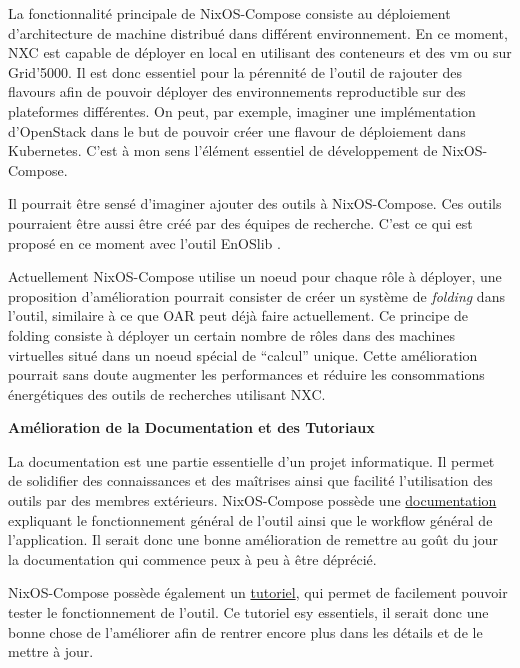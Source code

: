\documentclass[a4paper,french,12pt, titlepage]{article}
\begin{document}
La fonctionnalité principale de NixOS-Compose consiste au déploiement
d'architecture de machine distribué dans différent environnement. En ce
moment, NXC est capable de déployer en local en utilisant des conteneurs
et des vm ou sur Grid'5000. Il est donc essentiel pour la pérennité de
l'outil de rajouter des flavours afin de pouvoir déployer des
environnements reproductible sur des plateformes différentes. On peut,
par exemple, imaginer une implémentation d'OpenStack dans le but de
pouvoir créer une flavour de déploiement dans Kubernetes. C'est à mon
sens l'élément essentiel de développement de NixOS-Compose.\newline

Il pourrait être sensé d'imaginer ajouter des outils à NixOS-Compose.
Ces outils pourraient être aussi être créé par des équipes de recherche.
C'est ce qui est proposé en ce moment avec l'outil EnOSlib
\cite{enoslib2021}.\newline

Actuellement NixOS-Compose utilise un noeud pour chaque rôle à déployer,
une proposition d'amélioration pourrait consister de créer un système de
\emph{folding} \cite{folding2023} dans l'outil, similaire à ce que OAR
peut déjà faire actuellement. Ce principe de folding consiste à déployer
un certain nombre de rôles dans des machines virtuelles situé dans un
noeud spécial de ``calcul'' unique. Cette amélioration pourrait sans
doute augmenter les performances et réduire les consommations
énergétiques des outils de recherches utilisant NXC.\newline

\textbf{Amélioration de la Documentation et des Tutoriaux}\newline

La documentation est une partie essentielle d'un projet informatique. Il
permet de solidifier des connaissances et des maîtrises ainsi que
facilité l'utilisation des outils par des membres extérieurs.
NixOS-Compose possède une
\href{https://nixos-compose.gitlabpages.inria.fr/nixos-compose/}{documentation}
expliquant le fonctionnement général de l'outil ainsi que le workflow
général de l'application. Il serait donc une bonne amélioration de
remettre au goût du jour la documentation qui commence peux à peu à être
déprécié.\newline

NixOS-Compose possède également un
\href{https://gitlab.inria.fr/nixos-compose/tuto-nxc}{tutoriel}, qui
permet de facilement pouvoir tester le fonctionnement de l'outil. Ce
tutoriel esy essentiels, il serait donc une bonne chose de l'améliorer
afin de rentrer encore plus dans les détails et de le mettre à
jour.\newline
\end{document}
